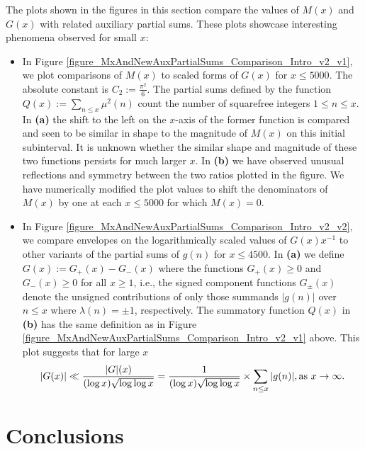 \documentclass[11pt,reqno,a4letter]{article}
\newcommand{\hlocalref}[1]{\hyperref[#1]{\ref{#1}}}
\numberwithin{equation}{section}
\numberwithin{figure}{section}
\numberwithin{table}{section}
\theoremstyle{plain}
\numberwithin{theorem}{section}
\theoremstyle{definition}
\theoremstyle{remark}
\newcommand{\mathtext}[1]{\text{\rm #1}}
\begin{document}
The plots shown in the figures in this section compare 
the values of $M(x)$ and $G(x)$ with related auxiliary partial sums. 
These plots showcase interesting phenomena observed for small $x$: 
\begin{itemize}

\item In Figure \hlocalref{figure_MxAndNewAuxPartialSums_Comparison_Intro_v2_v1}, 
      we plot comparisons of $M(x)$ to scaled forms of $G(x)$ for $x \leq 5000$. The 
      absolute constant is $C_2 := \frac{\pi^2}{6}$. The partial sums defined by the function 
      $Q(x) := \sum_{n \leq x} \mu^2(n)$ count the number of squarefree integers $1 \leq n \leq x$. 
      In \textbf{(a)} the shift to the left on the $x$-axis of the former function 
      is compared and seen to be similar in shape to the magnitude of $M(x)$ on this initial subinterval. 
      It is unknown whether the similar shape and magnitude of these two functions persists for 
      much larger $x$. 
      In \textbf{(b)} we have observed unusual reflections and symmetry between the two ratios plotted in the 
      figure. We have numerically modified the plot values to shift the denominators of 
      $M(x)$ by one at each $x \leq 5000$ for which $M(x) = 0$. 

\item In Figure \hlocalref{figure_MxAndNewAuxPartialSums_Comparison_Intro_v2_v2}, we compare 
      envelopes on the logarithmically scaled values of $G(x) x^{-1}$ to other variants of 
      the partial sums of $g(n)$ for $x \leq 4500$. 
      In \textbf{(a)} we define $G(x) := G_{+}(x) - G_{-}(x)$ where the functions 
      $G_{+}(x) \geq 0$ and $G_{-}(x) \geq 0$ for all $x \geq 1$, 
      i.e., the signed component functions $G_{\pm}(x)$ 
      denote the unsigned contributions of only those summands 
      $|g(n)|$ over $n \leq x$ where $\lambda(n) = \pm 1$, respectively. 
      The summatory function $Q(x)$ 
      in \textbf{(b)} has the same definition as in 
      Figure \hlocalref{figure_MxAndNewAuxPartialSums_Comparison_Intro_v2_v1} above. 
      This plot suggests that for large $x$ 
      \[
      |G(x)| \ll \frac{|G|(x)}{(\log x) \sqrt{\log\log x}} = 
           \frac{1}{(\log x) \sqrt{\log\log x}} \times \sum_{n \leq x} |g(n)|, 
           \mathtext{ as } x \rightarrow \infty.
      \]

\end{itemize}

\section{Conclusions}
\end{document}
